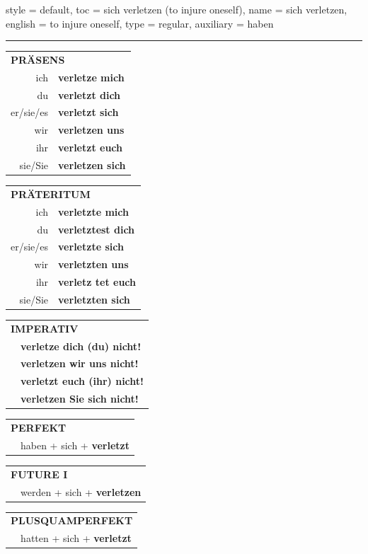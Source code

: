 \begin{verbentry}{
  style = {default},
  toc = {sich verletzen (to injure oneself)},
  name = {sich verletzen},
  english = {to injure oneself},
  type = {regular},
  auxiliary = {haben}
}


\vspace{5pt}
\hrule
\vspace{5pt}

\begin{tabular}{rl}
\multicolumn{2}{l}{\textbf{PRÄSENS}}\\
ich & \textbf{verletze mich}\\
du & \textbf{verletzt dich}\\
er/sie/es & \textbf{verletzt sich}\\
wir & \textbf{verletzen uns}\\
ihr & \textbf{verletzt euch}\\
sie/Sie & \textbf{verletzen sich}\\
\end{tabular}
\hfill
\begin{tabular}{rl}
\multicolumn{2}{l}{\textbf{PRÄTERITUM}}\\
ich & \textbf{verletzte mich}\\
du & \textbf{verletztest dich}\\
er/sie/es & \textbf{verletzte sich}\\
wir & \textbf{verletzten uns}\\
ihr & \textbf{verletz tet euch}\\
sie/Sie & \textbf{verletzten sich}\\
\end{tabular}
\hfill
\begin{tabular}{rl}
\multicolumn{2}{l}{\textbf{IMPERATIV}}\\
& \textbf{verletze dich (du) nicht!}\\
& \textbf{verletzen wir uns nicht!}\\
& \textbf{verletzt euch (ihr) nicht!}\\
& \textbf{verletzen Sie sich nicht!}\\
\end{tabular}

\vspace{10pt}

\begin{tabular}{rl}
\multicolumn{2}{l}{\textbf{PERFEKT}}\\
& haben + sich + \textbf{verletzt}\\
\end{tabular}
\hfill
\begin{tabular}{rl}
\multicolumn{2}{l}{\textbf{FUTURE I}}\\
& werden + sich + \textbf{verletzen}\\
\end{tabular}
\hfill
\begin{tabular}{rl}
\multicolumn{2}{l}{\textbf{PLUSQUAMPERFEKT}}\\
& hatten + sich + \textbf{verletzt}\\
\end{tabular}


\end{verbentry}
